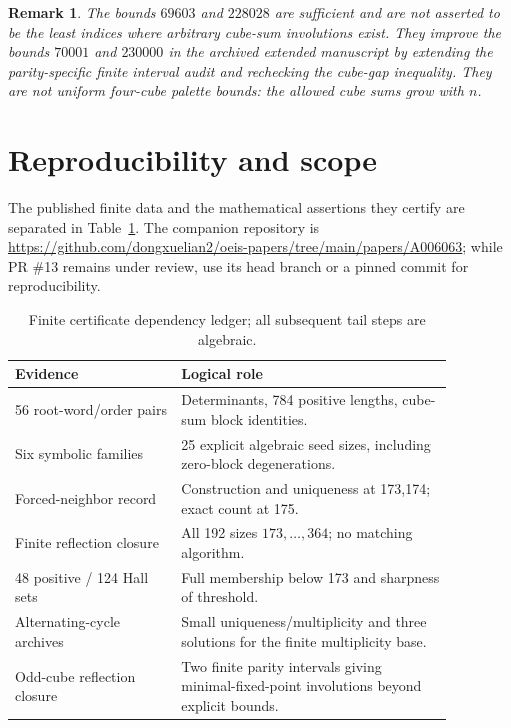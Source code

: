 \documentclass[9pt]{extarticle}
\newtheorem{remark}[theorem]{Remark}
\begin{document}
\begin{remark}
The bounds $69603$ and $228028$ are sufficient and are not asserted
to be the least indices where arbitrary cube-sum involutions exist.
They improve the bounds $70001$ and $230000$ in the archived extended
manuscript by extending the parity-specific finite interval audit and
rechecking the cube-gap inequality.  They are \emph{not} uniform
four-cube palette bounds: the allowed cube sums grow with $n$.
\end{remark}

\section{Reproducibility and scope}\label{sec:audit}
The published finite data and the mathematical assertions they certify are separated in Table~\ref{tab:ledger}. The companion repository is \url{https://github.com/dongxuelian2/oeis-papers/tree/main/papers/A006063}; while PR \#13 remains under review, use its head branch or a pinned commit for reproducibility.
\begin{table}[ht]
\small\centering
\begin{tabular}{@{}p{0.33\linewidth}p{0.54\linewidth}@{}}
\toprule
\textbf{Evidence} & \textbf{Logical role}\\\midrule
56 root-word/order pairs & Determinants, 784 positive lengths, cube-sum block identities.\\
Six symbolic families & 25 explicit algebraic seed sizes, including zero-block degenerations.\\
Forced-neighbor record & Construction and uniqueness at 173,174; exact count at 175.\\
Finite reflection closure & All 192 sizes $173,\ldots,364$; no matching algorithm.\\
48 positive / 124 Hall sets & Full membership below 173 and sharpness of threshold.\\
Alternating-cycle archives & Small uniqueness/multiplicity and three solutions for the finite multiplicity base.\\
Odd-cube reflection closure & Two finite parity intervals giving minimal-fixed-point involutions beyond explicit bounds.\\\bottomrule
\end{tabular}
\caption{Finite certificate dependency ledger; all subsequent tail steps are algebraic.}\label{tab:ledger}
\end{table}
\end{document}
